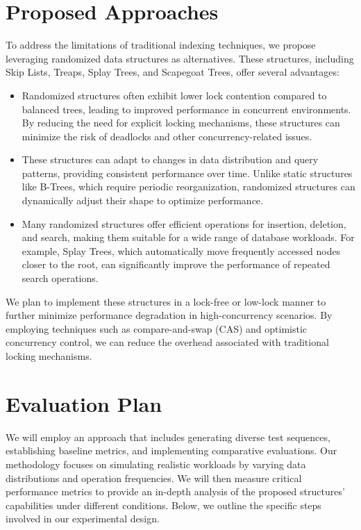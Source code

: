 \documentclass[sigconf]{acmart}
\begin{document}
\section{Proposed Approaches}

To address the limitations of traditional indexing techniques, we propose leveraging randomized data structures as alternatives. These structures, including Skip Lists, Treaps, Splay Trees, and Scapegoat Trees, offer several advantages:

\begin{itemize}
    \item Randomized structures often exhibit lower lock contention \cite{claudiu_2008_skip} compared to balanced trees, leading to improved performance in concurrent environments. By reducing the need for explicit locking mechanisms, these structures can minimize the risk of deadlocks and other concurrency-related issues. \cite{fraser_2007_concurrent}

    \item These structures can adapt to changes in data distribution and query patterns, providing consistent performance over time. Unlike static structures like B-Trees, which require periodic reorganization, randomized structures can dynamically adjust their shape to optimize performance.

    \item Many randomized structures offer efficient operations for insertion, deletion, and search, making them suitable for a wide range of database workloads. For example, Splay Trees, which automatically move frequently accessed nodes closer to the root, can significantly improve the performance of repeated search operations.
\end{itemize}
        
We plan to implement these structures in a lock-free or low-lock manner to further minimize performance degradation in high-concurrency scenarios. By employing techniques such as compare-and-swap (CAS) and optimistic concurrency control, we can reduce the overhead associated with traditional locking mechanisms.

\section{Evaluation Plan}

We will employ an approach that includes generating diverse test sequences, establishing baseline metrics, and implementing comparative evaluations. Our methodology focuses on simulating realistic workloads by varying data distributions and operation frequencies. We will then measure critical performance metrics to provide an in-depth analysis of the proposed structures' capabilities under different conditions. Below, we outline the specific steps involved in our experimental design.
\end{document}
